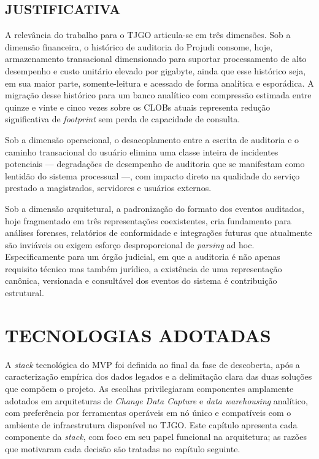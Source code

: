 \documentclass[12pt,letterpaper,oneside]{report}
\begin{document}
\section{JUSTIFICATIVA}

A relevância do trabalho para o TJGO articula-se em três dimensões. Sob a dimensão financeira, o histórico de auditoria do Projudi consome, hoje, armazenamento transacional dimensionado para suportar processamento de alto desempenho e custo unitário elevado por gigabyte, ainda que esse histórico seja, em sua maior parte, somente-leitura e acessado de forma analítica e esporádica. A migração desse histórico para um banco analítico com compressão estimada entre quinze e vinte e cinco vezes sobre os CLOBs atuais representa redução significativa de \textit{footprint} sem perda de capacidade de consulta.

Sob a dimensão operacional, o desacoplamento entre a escrita de auditoria e o caminho transacional do usuário elimina uma classe inteira de incidentes potenciais — degradações de desempenho de auditoria que se manifestam como lentidão do sistema processual —, com impacto direto na qualidade do serviço prestado a magistrados, servidores e usuários externos.

Sob a dimensão arquitetural, a padronização do formato dos eventos auditados, hoje fragmentado em três representações coexistentes, cria fundamento para análises forenses, relatórios de conformidade e integrações futuras que atualmente são inviáveis ou exigem esforço desproporcional de \textit{parsing} ad hoc. Especificamente para um órgão judicial, em que a auditoria é não apenas requisito técnico mas também jurídico, a existência de uma representação canônica, versionada e consultável dos eventos do sistema é contribuição estrutural.


\chapter{TECNOLOGIAS ADOTADAS}

A \textit{stack} tecnológica do MVP foi definida ao final da fase de descoberta, após a caracterização empírica dos dados legados e a delimitação clara das duas soluções que compõem o projeto. As escolhas privilegiaram componentes amplamente adotados em arquiteturas de \textit{Change Data Capture} e \textit{data warehousing} analítico, com preferência por ferramentas operáveis em nó único e compatíveis com o ambiente de infraestrutura disponível no TJGO. Este capítulo apresenta cada componente da \textit{stack}, com foco em seu papel funcional na arquitetura; as razões que motivaram cada decisão são tratadas no capítulo seguinte.
\end{document}
